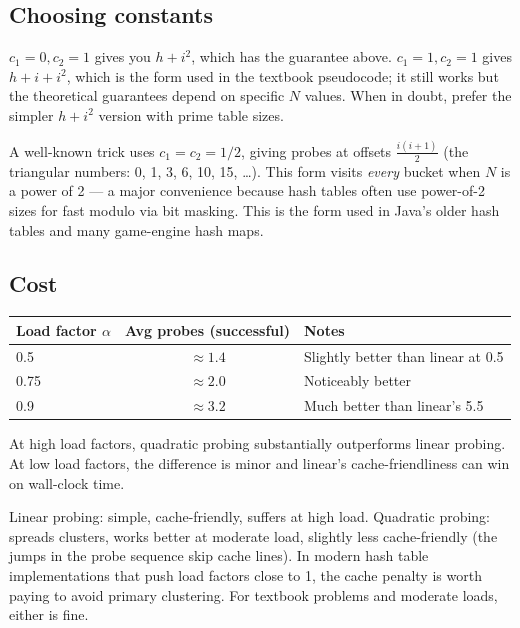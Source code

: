 \documentclass[11pt]{article}
\begin{document}
\subsection*{Choosing constants}

$c_1 = 0, c_2 = 1$ gives you $h + i^2$, which has the guarantee
above. $c_1 = 1, c_2 = 1$ gives $h + i + i^2$, which is the form
used in the textbook pseudocode; it still works but the theoretical
guarantees depend on specific $N$ values. When in doubt, prefer
the simpler $h + i^2$ version with prime table sizes.

\begin{examplebox}
A well-known trick uses $c_1 = c_2 = 1/2$, giving probes at
offsets $\frac{i(i+1)}{2}$ (the triangular numbers: 0, 1, 3, 6,
10, 15, \ldots). This form visits \emph{every} bucket when $N$
is a power of 2 --- a major convenience because hash tables often
use power-of-2 sizes for fast modulo via bit masking. This is the
form used in Java's older hash tables and many game-engine hash
maps.
\end{examplebox}

\subsection*{Cost}

\begin{center}
\begin{tabular}{|l|c|l|}
\hline
\textbf{Load factor $\alpha$} & \textbf{Avg probes (successful)} & \textbf{Notes} \\
\hline
0.5  & $\approx 1.4$  & Slightly better than linear at 0.5 \\
0.75 & $\approx 2.0$  & Noticeably better \\
0.9  & $\approx 3.2$  & Much better than linear's 5.5 \\
\hline
\end{tabular}
\end{center}

At high load factors, quadratic probing substantially outperforms
linear probing. At low load factors, the difference is minor
and linear's cache-friendliness can win on wall-clock time.

\begin{ideabox}
Linear probing: simple, cache-friendly, suffers at high load.
Quadratic probing: spreads clusters, works better at moderate
load, slightly less cache-friendly (the jumps in the probe
sequence skip cache lines). In modern hash table implementations
that push load factors close to 1, the cache penalty is worth
paying to avoid primary clustering. For textbook problems and
moderate loads, either is fine.
\end{ideabox}
\end{document}
